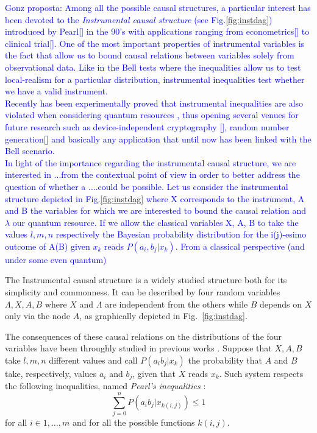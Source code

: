 \documentclass[
    nofootinbin,
    floatfix,
    amsfonts,
    twocolumn, 
    aps, 
    prl]{revtex4-1}
\begin{document}
\textcolor{blue}{Gonz proposta: Among all the possible causal structures, a particular interest has been devoted to the \textit{Instrumental causal structure} (see Fig.\ref{fig:instdag}) introduced by Pearl[] in the 90's with applications ranging from econometrics[] to clinical trial[]. One of the most important properties of instrumental variables is the fact that allow us to bound causal relations between variables solely from observational data. Like in the Bell tests where the inequalities allow us to test local-realism for a particular distribution, instrumental inequalities test whether we have a valid instrument.}\\
\textcolor{blue}{Recently has been experimentally proved that instrumental inequalities are also violated when considering quantum resources \cite{chaves2018}, thus opening several venues for future research such as device-independent cryptography [], random number generation[] and basically any application that until now has been linked with the Bell scenario.}\\

\textcolor{blue}{In light of the importance regarding the instrumental causal structure, we are interested in ...from the contextual point of view in order to better address the question of whether a ....could be possible.
Let us consider the instrumental structure depicted in Fig.\ref{fig:instdag} where X corresponds to the instrument, A and B the variables for which we are interested to bound the causal relation and $\lambda$ our quantum resource. If we allow the classical variables X, A, B to take the values $l,m,n$ respectively the Bayesian probability distribution for the i(j)-esimo outcome of A(B) given $x_k$ reads $P(a_i,b_j|x_k)$. From a classical perspective (and under some even quantum)}


The Instrumental causal structure is a widely studied
structure both for its simplicity and commonness.
It can be described by four random variables $\Lambda, X, A, B$ where $X$ and
$\Lambda$ are independent from the others while $B$ depends on $X$ only via the node $A$,
as graphically depicted in Fig.~\ref{fig:instdag}.

The consequences of these causal relations on the distributions of the four
variables have been throughly studied in previous works \cite{pearl1995,
bonet2001}.
Suppose that $X, A, B$ take $l,m,n$ different values and 
call $P(a_i b_j | x_k)$ the probability that $A$ and $B$ take, respectively, values $a_i$
and $b_j$, given that $X$ reads $x_k$.
Such system respects the following inequalities,
named \emph{Pearl's inequalities} \cite{pearl1995}:
\begin{equation} 
    \sum_{j=0}^{n} P(a_i b_j|x_{k(i,j)}) \le 1
    \label{eq:pearl_ineq}
\end{equation}
for all $i \in {1,\ldots, m}$ and for all the possible functions $k(i,j)$.
\end{document}
